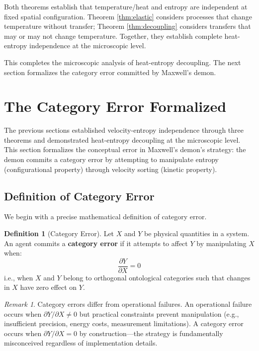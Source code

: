 \documentclass[10pt,twocolumn,letterpaper]{article}
\theoremstyle{definition}
\newtheorem{definition}[theorem]{Definition}
\theoremstyle{remark}
\newtheorem{remark}[theorem]{Remark}
\newcommand{\pderiv}[2]{\frac{\partial #1}{\partial #2}}
\begin{document}
Both theorems establish that temperature/heat and entropy are independent at fixed spatial configuration. Theorem \ref{thm:elastic} considers processes that change temperature without transfer; Theorem \ref{thm:decoupling} considers transfers that may or may not change temperature. Together, they establish complete heat-entropy independence at the microscopic level.

This completes the microscopic analysis of heat-entropy decoupling. The next section formalizes the category error committed by Maxwell's demon.

\section{The Category Error Formalized}
\label{sec:category}

The previous sections established velocity-entropy independence through three theorems and demonstrated heat-entropy decoupling at the microscopic level. This section formalizes the conceptual error in Maxwell's demon's strategy: the demon commits a category error by attempting to manipulate entropy (configurational property) through velocity sorting (kinetic property).

\subsection{Definition of Category Error}

We begin with a precise mathematical definition of category error.

\begin{definition}[Category Error]
\label{def:category_error}
Let $X$ and $Y$ be physical quantities in a system. An agent commits a \textbf{category error} if it attempts to affect $Y$ by manipulating $X$ when:
\begin{equation}
\pderiv{Y}{X} = 0
\end{equation}
i.e., when $X$ and $Y$ belong to orthogonal ontological categories such that changes in $X$ have zero effect on $Y$.
\end{definition}

\begin{remark}
Category errors differ from operational failures. An operational failure occurs when $\partial Y/\partial X \neq 0$ but practical constraints prevent manipulation (e.g., insufficient precision, energy costs, measurement limitations). A category error occurs when $\partial Y/\partial X = 0$ by construction—the strategy is fundamentally misconceived regardless of implementation details.
\end{remark}
\end{document}

